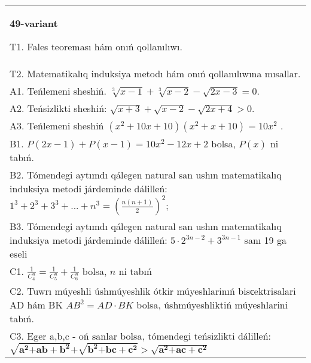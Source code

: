 \documentclass{article}
\begin{document}
\begin{tabular}{m{17cm}}
\textbf{49-variant}
\newline

T1. Fales teoreması hám onıń qollanılıwı. \\
T2. Matematikalıq induksiya metodı hám onıń qollanılıwına mısallar. \\
A1. Teńlemeni sheshiń. \(\sqrt[3]{x - 1} + \sqrt[3]{x - 2} - \sqrt{2x - 3} = 0\). \\
A2. Teńsizlikti sheshiń: \(\sqrt{x + 3} + \sqrt{x - 2} - \sqrt{2x + 4} > 0\). \\
A3. Teńlemeni sheshiń \(\left( x^{2} + 10x + 10 \right)\left( x^{2} + x + 10 \right) = 10x^{2}\) . \\
B1. \(P(2x - 1) + P(x - 1) = 10x^{2} - 12x + 2\) bolsa, \(P(x)\) ni tabıń. \\
B2. Tómendegi aytımdı qálegen natural san ushın matematikalıq induksiya metodi járdeminde dálilleń: \(1^{3} + 2^{3} + 3^{3} + ... + n^{3} = \left( \frac{n(n + 1)}{2} \right)^{2}\); \\
B3. Tómendegi aytımdı qálegen natural san ushın matematikalıq induksiya metodi járdeminde dálilleń: \(5 \cdot 2^{3n - 2} + 3^{3n - 1}\) sanı 19 ga eseli \\
C1. \(\frac{1}{C_{4}^{n}} = \frac{1}{C_{5}^{n}} + \frac{1}{C_{6}^{n}}\) bolsa, \(n\) ni tabıń \\
C2. Tuwrı múyeshli úshmúyeshlik ótkir múyeshlarinıń bisєektrisalari AD hám BK \(AB^{2} = AD \cdot BK\) bolsa, úshmúyeshliktiń múyeshlarini tabıń. \\
C3. Eger a,b,c - oń sanlar bolsa, tómendegi teńsizlikti dálilleń: \(\sqrt{\mathbf{a}^{\mathbf{2}}\mathbf{+ ab +}\mathbf{b}^{\mathbf{2}}}\mathbf{+}\sqrt{\mathbf{b}^{\mathbf{2}}\mathbf{+ bc +}\mathbf{c}^{\mathbf{2}}}\mathbf{>}\sqrt{\mathbf{a}^{\mathbf{2}}\mathbf{+ ac +}\mathbf{c}^{\mathbf{2}}}\) \\

\end{tabular}
\vspace{1cm}
\end{document}
